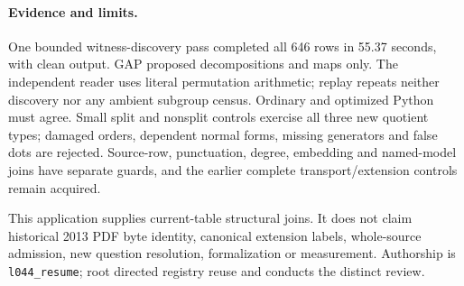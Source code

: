 \documentclass[11pt]{article}
\begin{document}
\paragraph{Evidence and limits.}
One bounded witness-discovery pass completed all 646 rows in 55.37 seconds,
with clean output. GAP proposed decompositions and maps only. The independent
reader uses literal permutation arithmetic; replay repeats neither discovery
nor any ambient subgroup census. Ordinary and optimized Python must agree.
Small split and nonsplit controls exercise all three new quotient types;
damaged orders, dependent normal forms, missing generators and false dots
are rejected. Source-row, punctuation, degree, embedding and named-model
joins have separate guards, and the earlier complete transport/extension
controls remain acquired.

This application supplies current-table structural joins. It does not claim
historical 2013 PDF byte identity, canonical extension labels, whole-source
admission, new question resolution, formalization or measurement.
Authorship is \texttt{l044\_resume}; root directed registry reuse and
conducts the distinct review.
\end{document}
